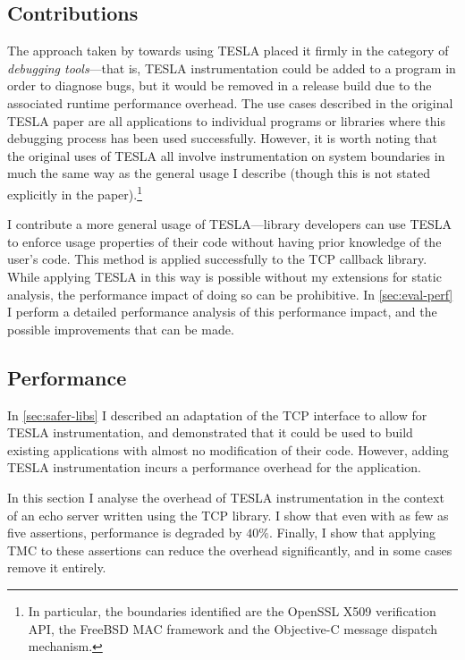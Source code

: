 \subsection{Contributions}

The approach taken by \textcite{anderson_tesla:_2014} towards using TESLA placed
it firmly in the category of \emph{debugging tools}---that is, TESLA
instrumentation could be added to a program in order to diagnose bugs, but it
would be removed in a release build due to the associated runtime performance
overhead. The use cases described in the original TESLA paper are all
applications to individual programs or libraries where this debugging process
has been used successfully. However, it is worth noting that the original uses
of TESLA all involve instrumentation on system boundaries in much the same way
as the general usage I describe (though this is not stated explicitly in the
paper).\footnote{In particular, the boundaries identified are the OpenSSL X509
verification API, the FreeBSD MAC framework and the Objective-C message dispatch
mechanism.}

I contribute a more general usage of TESLA---library developers can use TESLA to
enforce usage properties of their code without having prior knowledge of the
user's code. This method is applied successfully to the \lwip{} TCP callback
library. While applying TESLA in this way is possible without my extensions for
static analysis, the performance impact of doing so can be prohibitive. In
\autoref{sec:eval-perf} I perform a detailed performance analysis of this
performance impact, and the possible improvements that can be made.

\subsection{Performance} \label{sec:eval-perf}

In \autoref{sec:safer-libs} I described an adaptation of the \lwip{} TCP interface
to allow for TESLA instrumentation, and demonstrated that it could be used to
build existing applications with almost no modification of their code. However,
adding TESLA instrumentation incurs a performance overhead for the application.

In this section I analyse the overhead of TESLA instrumentation in the context
of an echo server written using the \lwip{} TCP library. I show that even with as
few as five assertions, performance is degraded by $40\%$. Finally, I show
that applying TMC to these assertions can reduce the overhead
significantly, and in some cases remove it entirely.

